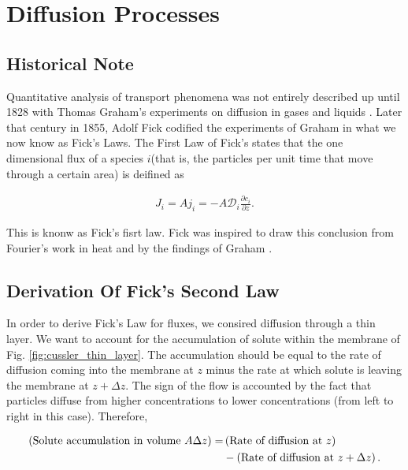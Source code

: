 \section{Diffusion Processes}


\subsection{Historical Note}

\par Quantitative analysis of transport phenomena was not entirely described up until 1828 with Thomas Graham's experiments on diffusion in gases and liquids \cite{cussler}. Later that century in 1855, Adolf Fick codified the experiments of Graham in what we now know as Fick's Laws. The First Law of Fick's states that the one dimensional flux of a species $i$(that is, the particles per unit time that move through a certain area) is deifined as \cite{cussler}

\begin{align}
\label{eq:fick-fluxes}
	J_i = A j_i = -A\mathcal{D}_i\frac{\partial c_i}{\partial z}.
\end{align}

This is knonw as Fick's fisrt law. Fick was inspired to draw this conclusion from Fourier's work in heat and by the findings of Graham \cite{fick}.


\subsection{Derivation Of Fick's Second Law}

In order to derive Fick's Law for fluxes, we consired diffusion through a thin layer. We want to account for the accumulation of solute within the membrane of Fig. \ref{fig:cussler_thin_layer}. The accumulation should be equal to the rate of diffusion coming into the membrane at $z$ minus the rate at which solute is leaving the membrane at $z+\Delta z$. The sign of the flow is accounted by the fact that particles diffuse from higher concentrations to lower concentrations (from left to right in this case). Therefore,

\begin{align}
	\left({\textnormal{Solute accumulation in volume }A\Delta z}\right) =& \left({\textnormal{Rate of diffusion at } z }\right) \nonumber\\
	&- \left({\textnormal{Rate of diffusion at } z+\Delta z}\right).\nonumber
\end{align}


